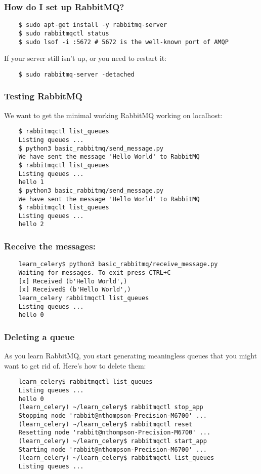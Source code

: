 \documentclass[9pt]{beamer}
\begin{document}
\begin{frame}[fragile]
  \frametitle{How do I set up RabbitMQ?}
  \begin{verbatim}
    $ sudo apt-get install -y rabbitmq-server
    $ sudo rabbitmqctl status
    $ sudo lsof -i :5672 # 5672 is the well-known port of AMQP
  \end{verbatim}
  If your server still isn't up, or you need to restart it:
  \begin{verbatim}
    $ sudo rabbitmq-server -detached 
  \end{verbatim}
\end{frame}

\begin{frame}[fragile]
  \frametitle{Testing RabbitMQ}
  We want to get the minimal working RabbitMQ working on localhost:
  \begin{verbatim}
    $ rabbitmqctl list_queues
    Listing queues ...
    $ python3 basic_rabbitmq/send_message.py
    We have sent the message 'Hello World' to RabbitMQ
    $ rabbitmqctl list_queues
    Listing queues ...
    hello 1
    $ python3 basic_rabbitmq/send_message.py
    We have sent the message 'Hello World' to RabbitMQ
    $ rabbitmqclt list_queues
    Listing queues ...
    hello 2
  \end{verbatim}
\end{frame}

\begin{frame}[fragile]
  \frametitle{Receive the messages:}
  \begin{verbatim}
    learn_celery$ python3 basic_rabbitmq/receive_message.py
    Waiting for messages. To exit press CTRL+C
    [x] Received (b'Hello World',)
    [x] Received$ (b'Hello World',)
    learn_celery rabbitmqctl list_queues
    Listing queues ...
    hello 0
  \end{verbatim}
\end{frame}

\begin{frame}[fragile]
  \frametitle{Deleting a queue}
  As you learn RabbitMQ, you start generating meaningless queues that you might want to get rid of. Here's how to delete them:
  \begin{verbatim}
    learn_celery$ rabbitmqctl list_queues
    Listing queues ...
    hello 0
    (learn_celery) ~/learn_celery$ rabbitmqctl stop_app
    Stopping node 'rabbit@nthompson-Precision-M6700' ...
    (learn_celery) ~/learn_celery$ rabbitmqctl reset
    Resetting node 'rabbit@nthompson-Precision-M6700' ...
    (learn_celery) ~/learn_celery$ rabbitmqctl start_app
    Starting node 'rabbit@nthompson-Precision-M6700' ...
    (learn_celery) ~/learn_celery$ rabbitmqctl list_queues
    Listing queues ...
  \end{verbatim}
\end{frame}
\end{document}
